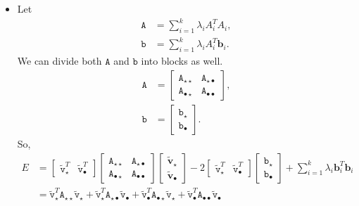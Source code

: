 \documentclass[10pt]{article}
\newcommand{\ve}[1]{\mathbf{#1}}
\newcommand{\mtt}[1]{\mathtt{#1}}
\begin{document}
\begin{itemize}
    \item Let
    \begin{align*}
        \mtt{A} &= \sum_{i=1}^k \lambda_i A_i^T A_i, \\
        \mtt{b} &= \sum_{i=1}^k \lambda_i A_i^T \ve{b}_i.
    \end{align*}
    We can divide both $\mtt{A}$ and $\mtt{b}$ into blocks as well.
    \begin{align*}
        \mtt{A} &= \begin{bmatrix} \mtt{A}_{\star \star} & \mtt{A}_{\star\bullet} \\ \mtt{A}_{\bullet \star} & \mtt{A}_{\bullet \bullet} \end{bmatrix}, \\
        \mtt{b} &= \begin{bmatrix} \mtt{b}_{\star} \\ \mtt{b}_{\bullet} \end{bmatrix}.
    \end{align*}
    So,
    \begin{align*}
        E 
        &= \begin{bmatrix} \widetilde{\mtt{v}}_{\star}^T & \widetilde{\mtt{v}}_{\bullet}^T \end{bmatrix}
        \begin{bmatrix} \mtt{A}_{\star \star} & \mtt{A}_{\star\bullet} \\ \mtt{A}_{\bullet \star} & \mtt{A}_{\bullet \bullet} \end{bmatrix}
        \begin{bmatrix} \widetilde{\ve{v}}_{\star} \\ \widetilde{\ve{v}}_{\bullet} \end{bmatrix}
        - 2 \begin{bmatrix} \widetilde{\mtt{v}}_{\star}^T & \widetilde{\mtt{v}}_{\bullet}^T \end{bmatrix} 
        \begin{bmatrix} \mtt{b}_{\star} \\ \mtt{b}_{\bullet} \end{bmatrix}
        + \sum_{i=1}^k \lambda_i \ve{b}_i^T \ve{b}_i \\
        &= \widetilde{\mtt{v}}_{\star}^T \mtt{A}_{\star \star} \widetilde{\mtt{v}}_{\star} + \widetilde{\mtt{v}}_{\star}^T \mtt{A}_{\star\bullet} \widetilde{\mtt{v}}_{\bullet} + \widetilde{\mtt{v}}_{\bullet}^T \mtt{A}_{\bullet \star} \widetilde{\mtt{v}}_{\star} + \widetilde{\mtt{v}}_{\bullet}^T \mtt{A}_{\bullet \bullet} \widetilde{\mtt{v}}_{\bullet}

\end{align*}
\end{itemize}
\end{document}

